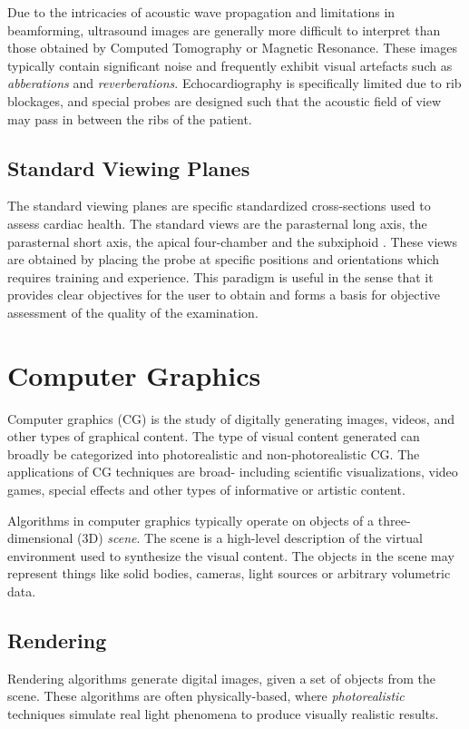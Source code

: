 \documentclass{article}
\begin{document}
Due to the intricacies of acoustic wave propagation and limitations in beamforming, ultrasound images are generally more difficult to interpret than those obtained by Computed Tomography or Magnetic Resonance.
These images typically contain significant noise and frequently exhibit visual artefacts such as \textit{abberations} and \textit{reverberations}. Echocardiography is specifically limited due to 
rib blockages, and special probes are designed such that the acoustic field of view may pass in between the ribs of the patient.

\subsection{Standard Viewing Planes}
The standard viewing planes are specific standardized cross-sections used to assess cardiac health.
The standard views are the parasternal long axis, the parasternal short axis, the apical four-chamber and 
the subxiphoid \cite{Shah2013}. These views are obtained by placing the probe at specific positions and orientations which requires
training and experience. This paradigm is useful in the sense that it provides clear objectives
for the user to obtain and forms a basis for objective assessment of the quality of the examination.





\section{Computer Graphics}
Computer graphics (CG) is the study of digitally generating images, videos, and other types of graphical content.
The type of visual content generated can broadly be categorized into photorealistic and non-photorealistic CG.
The applications of CG techniques are broad- including scientific visualizations, video games, special effects and other types of informative or artistic content.

Algorithms in computer graphics typically operate on objects of a three-dimensional (3D) \textit{scene}. The scene is a high-level description of the virtual environment used to synthesize the visual content.
The objects in the scene may represent things like solid bodies, cameras, light sources or arbitrary volumetric data.

\subsection{Rendering}
Rendering algorithms generate digital images, given a set of objects from the scene. These algorithms
are often physically-based, where \textit{photorealistic} techniques simulate real light phenomena to produce visually realistic results. 
\end{document}
